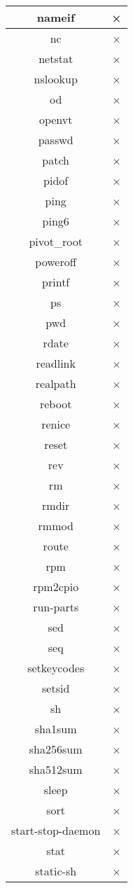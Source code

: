 \begin{longtable}{cc}
nameif & × \\ \hline
nc & × \\ \hline
netstat & × \\ \hline
nslookup & × \\ \hline
od & × \\ \hline
openvt & × \\ \hline
passwd & × \\ \hline
patch & × \\ \hline
pidof & × \\ \hline
ping & × \\ \hline
ping6 & × \\ \hline
pivot\_root & × \\ \hline
poweroff & × \\ \hline
printf & × \\ \hline
ps & × \\ \hline
pwd & × \\ \hline
rdate & × \\ \hline
readlink & × \\ \hline
realpath & × \\ \hline
reboot & × \\ \hline
renice & × \\ \hline
reset & × \\ \hline
rev & × \\ \hline
rm & × \\ \hline
rmdir & × \\ \hline
rmmod & × \\ \hline
route & × \\ \hline
rpm & × \\ \hline
rpm2cpio & × \\ \hline
run-parts & × \\ \hline
sed & × \\ \hline
seq & × \\ \hline
setkeycodes & × \\ \hline
setsid & × \\ \hline
sh & × \\ \hline
sha1sum & × \\ \hline
sha256sum & × \\ \hline
sha512sum & × \\ \hline
sleep & × \\ \hline
sort & × \\ \hline
start-stop-daemon & × \\ \hline
stat & × \\ \hline
static-sh & × \\ \hline

\end{longtable}
